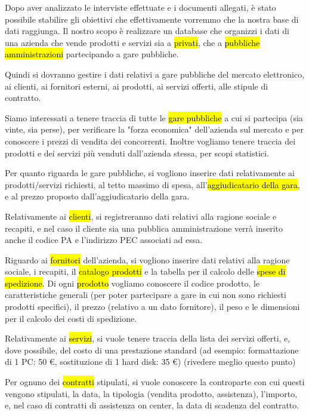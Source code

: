 
Dopo aver analizzato le interviste effettuate e i documenti allegati, è stato possibile stabilire gli obiettivi che effettivamente vorremmo che la nostra base di dati raggiunga.
Il nostro scopo è realizzare un database che organizzi i dati di una azienda che vende prodotti e servizi sia a \hl{privati}, che a \hl{pubbliche amministrazioni} partecipando a gare pubbliche.


\noindent
\newline
Quindi si dovranno gestire i dati relativi a gare pubbliche del mercato elettronico, ai clienti, ai fornitori esterni, ai prodotti, ai servizi offerti, alle stipule di contratto.

\noindent
\newline
Siamo interessati a tenere traccia di tutte le \hl{gare pubbliche} a cui si partecipa (sia vinte, sia perse), per verificare la "forza economica" dell'azienda sul mercato e per conoscere i prezzi di vendita dei concorrenti.
Inoltre vogliamo tenere traccia dei prodotti e dei servizi più venduti dall'azienda stessa, per scopi statistici.

\noindent
\newline
Per quanto riguarda le gare pubbliche, si vogliono inserire dati relativamente ai prodotti/servizi richiesti, al tetto massimo di spesa, all'\hl{aggiudicatario della gara}, e al prezzo proposto dall'aggiudicatario della gara.

\noindent
\newline
Relativamente ai \hl{clienti}, si registreranno dati relativi alla ragione sociale e recapiti, e nel caso il cliente sia una pubblica amministrazione verrà inserito anche il codice PA e l'indirizzo PEC associati ad essa.

\noindent
\newline
Riguardo ai \hl{fornitori} dell'azienda, si vogliono inserire dati relativi alla ragione sociale, i recapiti, il \hl{catalogo prodotti} e la tabella per il calcolo delle \hl{spese di spedizione}.
Di ogni \hl{prodotto} vogliamo conoscere il codice prodotto, le caratteristiche generali (per poter partecipare a gare in cui non sono richiesti prodotti specifici), il prezzo (relativo a un dato fornitore), il peso e le dimensioni per il calcolo dei costi di spedizione.

\noindent
\newline
Relativamente ai \hl{servizi}, si vuole tenere traccia della lista dei servizi offerti, e, dove possibile, del costo di una prestazione standard (ad esempio: formattazione di 1 PC: 50 \euro, sostituzione di 1 hard disk: 35 \euro) (rivedere meglio questo punto)

\noindent
\newline
Per ognuno dei \hl{contratti} stipulati, si vuole conoscere la controparte con cui questi vengono stipulati, la data, la tipologia (vendita prodotto, assistenza), l'importo, e, nel caso di contratti di assistenza on center, la data di scadenza del contratto.

\newpage
